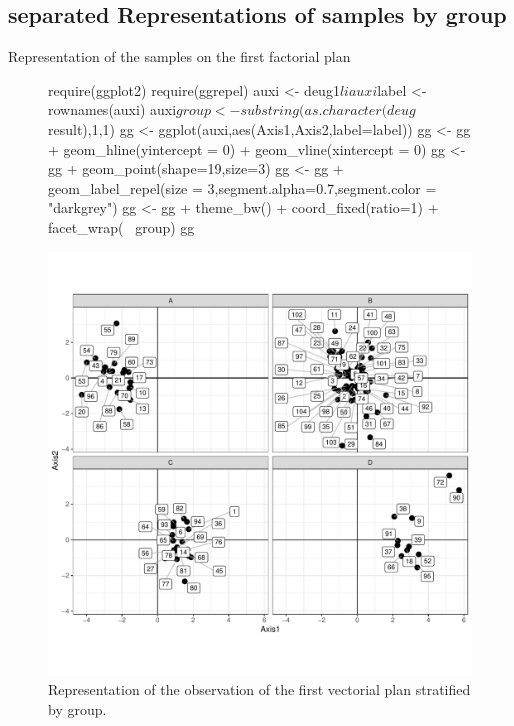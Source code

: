 \documentclass[a4paper,10pt]{article}
\begin{document}
\subsection{separated Representations of samples by group}

Representation of the samples on the first factorial plan

\begin{figure}[H]
\begin{center}
\begin{Schunk}
\begin{Sinput}
  require(ggplot2)
  require(ggrepel)
  auxi <- deug1$li
  auxi$label <- rownames(auxi)
  auxi$group <- substring(as.character(deug$result),1,1)
  gg <- ggplot(auxi,aes(Axis1,Axis2,label=label))
  gg <- gg + geom_hline(yintercept = 0) + geom_vline(xintercept = 0)
  gg <- gg + geom_point(shape=19,size=3)
  gg <- gg + geom_label_repel(size = 3,segment.alpha=0.7,segment.color = "darkgrey")
  gg <-  gg + theme_bw() + coord_fixed(ratio=1) + facet_wrap(~ group) 
  gg
\end{Sinput}
\end{Schunk}
\includegraphics{figs/sweave-liclass1}
\caption{Representation of the observation of the first vectorial plan stratified by group.}
\label{fig:liclass1}
\end{center}
\end{figure}
\end{document}
